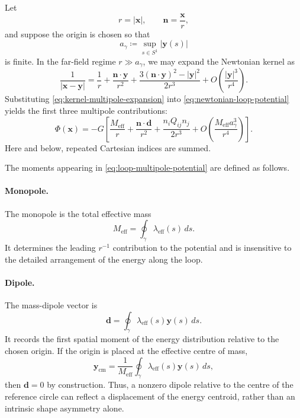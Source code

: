 \documentclass{article}
\numberwithin{tm}{section}
\numberwithin{dn}{section}
\numberwithin{as}{section}
\numberwithin{rk}{section}
\numberwithin{lem}{section}
\numberwithin{ax}{section}
\numberwithin{pp}{section}
\numberwithin{eg}{section}
\numberwithin{war}{section}
\numberwithin{equation}{section}
\numberwithin{prop}{section}
\numberwithin{nt}{section}
\numberwithin{rc}{section}
\begin{document}
Let
\[
r=|\mathbf{x}|,
\qquad
\mathbf{n}=\frac{\mathbf{x}}{r},
\]
and suppose the origin is chosen so that
\[
a_\gamma
\coloneq
\sup_{s\in S^1}|\mathbf{y}(s)|
\]
is finite. In the far-field regime $r\gg a_\gamma$, we may
expand the Newtonian kernel as
\begin{equation}
	\label{eq:kernel-multipole-expansion}
	\frac{1}{|\mathbf{x}-\mathbf{y}|}
	=
	\frac{1}{r}
	+\frac{\mathbf{n}\cdot\mathbf{y}}{r^2}
	+\frac{3(\mathbf{n}\cdot\mathbf{y})^2-|\mathbf{y}|^2}
	{2r^3}
	+O\!\left(\frac{|\mathbf{y}|^3}{r^4}\right).
\end{equation}
Substituting \eqref{eq:kernel-multipole-expansion} into
\eqref{eq:newtonian-loop-potential} yields the first three
multipole contributions:
\begin{equation}
	\label{eq:loop-multipole-potential}
	\Phi(\mathbf{x})
	=
	-G\left[
	\frac{M_{\mathrm{eff}}}{r}
	+\frac{\mathbf{n}\cdot\mathbf{d}}{r^2}
	+\frac{n_iQ_{ij}n_j}{2r^3}
	+O\!\left(
	\frac{M_{\mathrm{eff}}a_\gamma^3}{r^4}
	\right)
	\right].
\end{equation}
Here and below, repeated Cartesian indices are summed.

The moments appearing in \eqref{eq:loop-multipole-potential}
are defined as follows.

\paragraph{Monopole.}
The monopole is the total effective mass
\begin{equation}
	M_{\mathrm{eff}}
	=
	\oint_\gamma\lambda_{\mathrm{eff}}(s)\,ds.
\end{equation}
It determines the leading $r^{-1}$ contribution to the
potential and is insensitive to the detailed arrangement of
the energy along the loop.

\paragraph{Dipole.}
The mass-dipole vector is
\begin{equation}
	\label{eq:loop-dipole}
	\mathbf{d}
	=
	\oint_\gamma
	\lambda_{\mathrm{eff}}(s)\mathbf{y}(s)\,ds.
\end{equation}
It records the first spatial moment of the energy distribution
relative to the chosen origin. If the origin is placed at the
effective centre of mass,
\begin{equation}
	\mathbf{y}_{\mathrm{cm}}
	=
	\frac{1}{M_{\mathrm{eff}}}
	\oint_\gamma
	\lambda_{\mathrm{eff}}(s)\mathbf{y}(s)\,ds,
\end{equation}
then $\mathbf{d}=0$ by construction. Thus, a nonzero dipole
relative to the centre of the reference circle can reflect
a displacement of the energy centroid, rather than an
intrinsic shape asymmetry alone.
\end{document}
